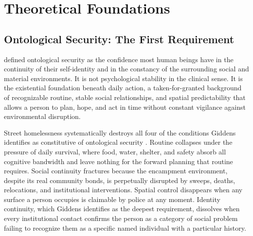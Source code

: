 \documentclass[12pt, letterpaper]{article}
\begin{document}
\clearpage
\section{Theoretical Foundations}

\subsection{Ontological Security: The First Requirement}

\citet{giddens_1991} defined ontological security as the confidence most human beings have in the continuity of their self-identity and in the constancy of the surrounding social and material environments. It is not psychological stability in the clinical sense. It is the existential foundation beneath daily action, a taken-for-granted background of recognizable routine, stable social relationships, and spatial predictability that allows a person to plan, hope, and act in time without constant vigilance against environmental disruption.

Street homelessness systematically destroys all four of the conditions Giddens identifies as constitutive of ontological security \citep{giddens_1991}. Routine collapses under the pressure of daily survival, where food, water, shelter, and safety absorb all cognitive bandwidth and leave nothing for the forward planning that routine requires. Social continuity fractures because the encampment environment, despite its real community bonds, is perpetually disrupted by sweeps, deaths, relocations, and institutional interventions. Spatial control disappears when any surface a person occupies is claimable by police at any moment. Identity continuity, which Giddens identifies as the deepest requirement, dissolves when every institutional contact confirms the person as a category of social problem failing to recognize them as a specific named individual with a particular history.
\end{document}
